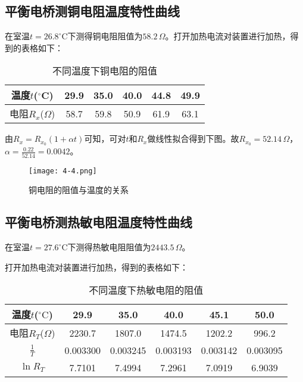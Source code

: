 \documentclass[12pt]{article}
\begin{document}
\subsection{平衡电桥测铜电阻温度特性曲线}

在室温$ t=26.8^\circ\mathrm{C} $下测得铜电阻阻值为$ 58.2\,\Omega $。打开加热电流对装置进行加热，得到的表格如下：

\begin{table}[htbp]
    \centering
    \begin{tabular}{|c|c|c|c|c|c|}
    \hline
    温度$t$($^\circ$C) & 29.9  & 35.0  & 40.0  & 44.8  & 49.9  \\
    \hline
    电阻$R_x$($\Omega$) & 58.7  & 59.8  & 50.9  & 61.9  & 63.1  \\
    \hline
    \end{tabular}
    \caption{不同温度下铜电阻的阻值}
\end{table}

由$R_x = R_{x_0}(1+\alpha t)$可知，可对$t$和$R_x$做线性拟合得到下图。故$R_{x_0}=52.14\,\Omega$，$\alpha = \frac{0.22}{52.14}=0.0042$。

\begin{figure}[h!]
    \centering
    \texttt{[image: 4-4.png]}
    \caption{铜电阻的阻值与温度的关系}
\end{figure}

\subsection{平衡电桥测热敏电阻温度特性曲线}
在室温$ t=27.6^\circ\mathrm{C} $下测得热敏电阻阻值为$ 2443.5\,\Omega $。

打开加热电流对装置进行加热，得到的表格如下：

\begin{table}[htbp]
    \centering
    \begin{tabular}{|c|c|c|c|c|c|}
    \hline
    温度$t$($^\circ\mathrm{C}$) & 29.9  & 35.0  & 40.0  & 45.1  & 50.0  \\
    \hline
    电阻$R_T$($\Omega$) & 2230.7  & 1807.0  & 1474.5  & 1202.2  & 996.2  \\
    \hline
    $\frac{1}{T}$ & 0.003300  & 0.003245  & 0.003193  & 0.003142  & 0.003095  \\
    \hline
    $\ln R_T$ & 7.7101  & 7.4994  & 7.2961  & 7.0919  & 6.9039  \\
    \hline
    \end{tabular}
    \caption{不同温度下热敏电阻的阻值}
\end{table}
\end{document}
